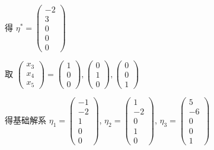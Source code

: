 		 得 \(\eta^{*} = \begin{pmatrix}
			 -2 \\
			 3  \\
			 0  \\
			 0  \\
			 0
		 \end{pmatrix} \)

		 取 \( \begin{pmatrix}
			 x_{3} \\
			 x_{4} \\
			 x_{5}
		 \end{pmatrix} = \begin{pmatrix}
			 1 \\
			 0 \\
			 0
		 \end{pmatrix}, \begin{pmatrix}
			 0 \\
			 1 \\
			 0
		 \end{pmatrix}, \begin{pmatrix}
			 0 \\
			 0 \\
			 1
		 \end{pmatrix} \)

		 得基础解系 \( \eta_{1} = \begin{pmatrix}
			 -1 \\
			 -2 \\
			 1  \\
			 0  \\
			 0
		 \end{pmatrix} \), \( \eta_{2} = \begin{pmatrix}
			 1  \\
			 -2 \\
			 0  \\
			 1  \\
			 0
		 \end{pmatrix} \), \( \eta_{3} = \begin{pmatrix}
			 5  \\
			 -6 \\
			 0  \\
			 0  \\
			 1
		 \end{pmatrix} \)

